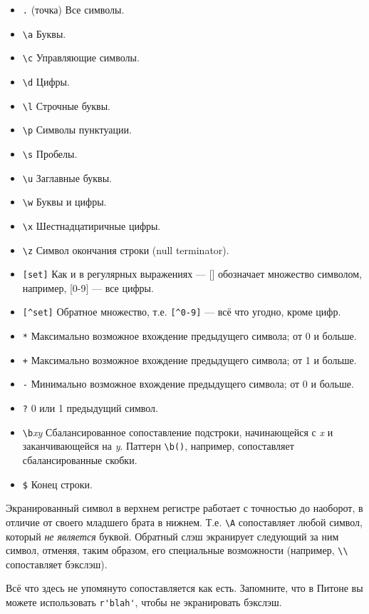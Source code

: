 \begin{itemize}
\item \verb|.| (точка) Все символы.
\item \verb|\a| Буквы.
\item \verb|\c| Управляющие символы.
\item \verb|\d| Цифры.
\item \verb|\l| Строчные буквы.
\item \verb|\p| Символы пунктуации.
\item \verb|\s| Пробелы.
\item \verb|\u| Заглавные буквы.
\item \verb|\w| Буквы и цифры.
\item \verb|\x| Шестнадцатиричные цифры.
\item \verb|\z| Символ окончания строки (null terminator).
\item \verb|[set]| Как и в регулярных выражениях --- [] обозначает
множество символом, например, [0-9] --- все цифры.
\item \verb|[^set]| Обратное множество, т.е. \verb|[^0-9]| --- всё что
угодно, кроме цифр.
\item \verb|*| Максимально возможное вхождение предыдущего символа; от
0 и больше.
\item \verb|+| Максимально возможное вхождение предыдущего символа; от
1 и больше.
\item \verb|-| Минимально возможное вхождение предыдущего символа; от
0 и больше.
\item \verb|?| 0 или 1 предыдущий символ.
\item \verb|\b|\emph{xy} Сбалансированное сопоставление подстроки,
начинающейся с \emph{x} и заканчивающейся на \emph{y}. Паттерн
\verb|\b()|, например, сопоставляет сбалансированные скобки.
\item \verb|$| Конец строки.
\end{itemize}

Экранированный символ в верхнем регистре работает с точностью до
наоборот, в отличие от своего младшего брата в нижнем. Т.е. \verb|\A| сопоставляет
любой символ, который \emph{не является} буквой. Обратный слэш
экранирует следующий за ним символ, отменяя, таким образом, его
специальные возможности (например, \verb|\\| сопоставляет бэкслэш).

Всё что здесь не упомянуто сопоставляется как есть. Запомните, что в
Питоне вы можете использовать \verb|r'blah'|, чтобы не экранировать
бэкслэш.

